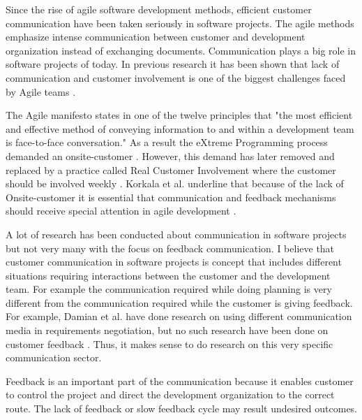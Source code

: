 \documentclass[conference]{IEEEtran}
\begin{document}


 

Since the rise of agile software development methods, efficient customer communication have been taken seriously in software projects. The agile methods emphasize intense communication between customer and development organization instead of exchanging documents. Communication plays a big role in software projects of today. In previous research it has been shown that lack of communication and customer involvement is one of the biggest challenges faced by Agile teams \cite{2010hoda}. 

The Agile manifesto states in one of the twelve principles that "the most efficient and effective method of conveying information to and within a development team is face-to-face conversation." \cite{agilemanifesto} As a result the eXtreme Programming process demanded an onsite-customer \cite{2002wake}. However, this demand has later removed and replaced by a practice called Real Customer Involvement where the customer should be involved weekly \cite{2006korkala}.  Korkala et al. underline that because of the lack of Onsite-customer it is essential that communication and feedback mechanisms should receive special attention in agile development \cite{2006korkala}.

A lot of research has been conducted about communication in software projects but not very many with the focus on feedback communication. I believe that customer communication in software projects is concept that includes different situations requiring interactions between the customer and the development team. For example the communication required while doing planning is very different from the communication required while the customer is giving feedback. For example, Damian et al. have done research on using different communication media in requirements negotiation, but no such research have been done on customer feedback \cite{2000damian}. Thus, it makes sense to do research on this very specific communication sector.

Feedback is an important part of the communication because it enables customer to control the project and direct the development organization to the correct route. The lack of feedback or slow feedback cycle may result undesired outcomes.
\end{document}
